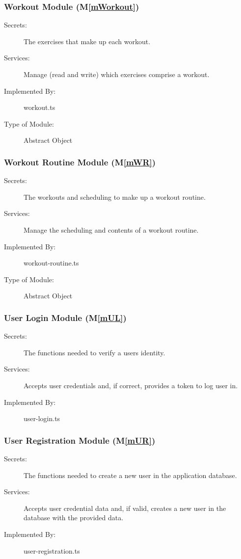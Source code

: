 \documentclass[12pt, titlepage]{article}
\newcommand{\mref}[1]{M\ref{#1}}
\begin{document}
\subsubsection{Workout Module (\mref{mWorkout})}

\begin{description}
\item[Secrets:] The exercises that make up each workout.
\item[Services:] Manage (read and write) which exercises comprise a workout.
\item[Implemented By:] workout.ts
\item[Type of Module:] Abstract Object
\end{description}

\subsubsection{Workout Routine Module (\mref{mWR})}

\begin{description}
\item[Secrets:] The workouts and scheduling to make up a workout routine.
\item[Services:] Manage the scheduling and contents of a workout routine.
\item[Implemented By:] workout-routine.ts
\item[Type of Module:] Abstract Object
\end{description}

\subsubsection{User Login Module (\mref{mUL})}

\begin{description}
\item[Secrets:] The functions needed to verify a users identity. 
\item[Services:] Accepts user credentials and, if correct, provides a token to log user in.
\item[Implemented By:] user-login.ts
\end{description}

\subsubsection{User Registration Module (\mref{mUR})}

\begin{description}
\item[Secrets:] The functions needed to create a new user in the application database. 
\item[Services:] Accepts user credential data and, if valid, creates a new user in the database with the provided data.
\item[Implemented By:] user-registration.ts
\end{description}
\end{document}
